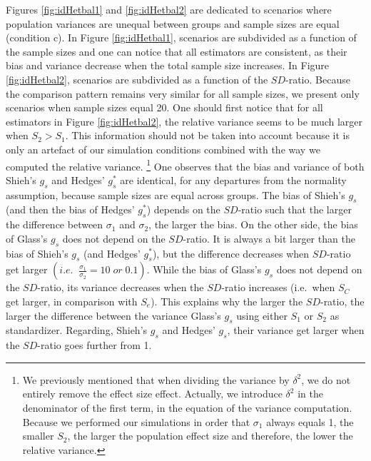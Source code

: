 \documentclass[
  english,
  man,floatsintext]{apa6}
\begin{document}
Figures \ref{fig:idHetbal1} and \ref{fig:idHetbal2} are dedicated to scenarios where population variances are unequal between groups and sample sizes are equal (condition c). In Figure \ref{fig:idHetbal1}, scenarios are subdivided as a function of the sample sizes and one can notice that all estimators are consistent, as their bias and variance decrease when the total sample size increases. In Figure \ref{fig:idHetbal2}, scenarios are subdivided as a function of the \(SD\)-ratio. Because the comparison pattern remains very similar for all sample sizes, we present only scenarios when sample sizes equal 20. One should first notice that for all estimators in Figure \ref{fig:idHetbal2}, the relative variance seems to be much larger when \(S_2>S_1\). This information should not be taken into account because it is only an artefact of our simulation conditions combined with the way we computed the relative variance. \footnote{We previously mentioned that when dividing the variance by $\delta^2$, we do not entirely remove the effect size effect. Actually, we introduce $\delta^2$ in the denominator of the first term, in the equation of the variance computation. Because we performed our simulations in order that $\sigma_1$ always equals 1, the smaller $S_2$, the larger the population effect size and therefore, the lower the relative variance.}
One observes that the bias and variance of both Shieh's \(g_s\) and Hedges' \(g^*_s\) are identical, for any departures from the normality assumption, because sample sizes are equal across groups. The bias of Shieh's \(g_s\) (and then the bias of Hedges' \(g^*_s\)) depends on the \(SD\)-ratio such that the larger the difference between \(\sigma_1\) and \(\sigma_2\), the larger the bias. On the other side, the bias of Glass's \(g_s\) does not depend on the \(SD\)-ratio. It is always a bit larger than the bias of Shieh's \(g_s\) (and Hedges' \(g^*_s\)), but the difference decreases when \(SD\)-ratio get larger \(\left(i.e. \; \;\frac{\sigma_1}{\sigma_2} = 10 \; or \; 0.1\right)\). While the bias of Glass's \(g_s\) does not depend on the \(SD\)-ratio, its variance decreases when the \(SD\)-ratio increases (i.e.~when \(S_C\) get larger, in comparison with \(S_e\)). This explains why the larger the \(SD\)-ratio, the larger the difference between the variance Glass's \(g_s\) using either \(S_1\) or \(S_2\) as standardizer. Regarding, Shieh's \(g_s\) and Hedges' \(g_s\), their variance get larger when the \(SD\)-ratio goes further from 1.
\end{document}
